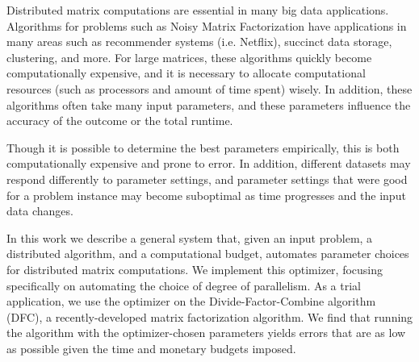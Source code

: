 Distributed matrix computations are essential in many big data 
applications. Algorithms for problems such as Noisy Matrix Factorization 
have applications in many areas such as recommender systems (i.e. Netflix),
succinct data storage, clustering, and more. For large matrices, these
algorithms quickly become computationally expensive, and it is necessary
to allocate computational resources (such as processors and amount of
time spent) wisely. In addition, these algorithms often take many input
parameters, and these parameters influence the accuracy of the outcome
or the total runtime. 

Though it is possible to determine the best parameters
empirically, this is both computationally expensive and prone to error. 
In addition, different datasets may respond differently to parameter
settings, and parameter settings that were good for a problem instance
may become suboptimal as time progresses and the input data changes.

In this work we describe a general system that, given an input problem, 
a distributed algorithm, and a computational budget, automates parameter 
choices for distributed matrix computations. We implement this optimizer,
focusing specifically on automating the choice of degree of parallelism. 
As a trial application, we use the optimizer on the Divide-Factor-Combine
algorithm (DFC), a recently-developed matrix factorization algorithm. 
We find that running the algorithm with the optimizer-chosen parameters 
yields errors that are as low as possible given the time and monetary 
budgets imposed.
